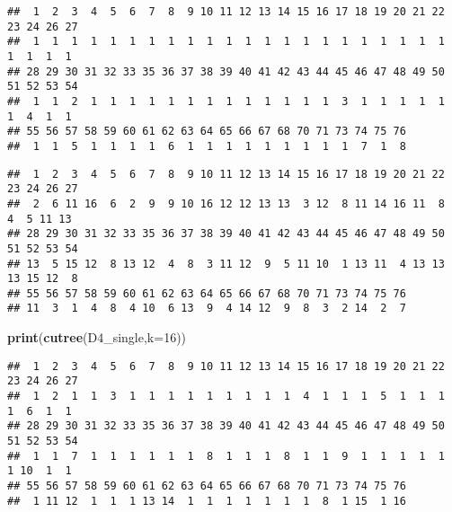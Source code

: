 \documentclass[
]{article}
\newenvironment{Shaded}{\begin{snugshade}}{\end{snugshade}}
\newcommand{\DataTypeTok}[1]{\textcolor[rgb]{0.13,0.29,0.53}{#1}}
\newcommand{\DecValTok}[1]{\textcolor[rgb]{0.00,0.00,0.81}{#1}}
\newcommand{\KeywordTok}[1]{\textcolor[rgb]{0.13,0.29,0.53}{\textbf{#1}}}
\newcommand{\NormalTok}[1]{#1}
\newcommand{\OperatorTok}[1]{\textcolor[rgb]{0.81,0.36,0.00}{\textbf{#1}}}
\begin{document}
\begin{verbatim}
##  1  2  3  4  5  6  7  8  9 10 11 12 13 14 15 16 17 18 19 20 21 22 23 24 26 27 
##  1  1  1  1  1  1  1  1  1  1  1  1  1  1  1  1  1  1  1  1  1  1  1  1  1  1 
## 28 29 30 31 32 33 35 36 37 38 39 40 41 42 43 44 45 46 47 48 49 50 51 52 53 54 
##  1  1  2  1  1  1  1  1  1  1  1  1  1  1  1  1  3  1  1  1  1  1  1  4  1  1 
## 55 56 57 58 59 60 61 62 63 64 65 66 67 68 70 71 73 74 75 76 
##  1  1  5  1  1  1  1  6  1  1  1  1  1  1  1  1  1  7  1  8
\end{verbatim}

\begin{Shaded}
\end{Shaded}

\begin{verbatim}
##  1  2  3  4  5  6  7  8  9 10 11 12 13 14 15 16 17 18 19 20 21 22 23 24 26 27 
##  2  6 11 16  6  2  9  9 10 16 12 12 13 13  3 12  8 11 14 16 11  8  4  5 11 13 
## 28 29 30 31 32 33 35 36 37 38 39 40 41 42 43 44 45 46 47 48 49 50 51 52 53 54 
## 13  5 15 12  8 13 12  4  8  3 11 12  9  5 11 10  1 13 11  4 13 13 13 15 12  8 
## 55 56 57 58 59 60 61 62 63 64 65 66 67 68 70 71 73 74 75 76 
## 11  3  1  4  8  4 10  6 13  9  4 14 12  9  8  3  2 14  2  7
\end{verbatim}

\begin{Shaded}
\begin{Highlighting}[]
\KeywordTok{print}\NormalTok{(}\KeywordTok{cutree}\NormalTok{(D4_single,}\DataTypeTok{k=}\DecValTok{16}\NormalTok{))}
\end{Highlighting}
\end{Shaded}

\begin{verbatim}
##  1  2  3  4  5  6  7  8  9 10 11 12 13 14 15 16 17 18 19 20 21 22 23 24 26 27 
##  1  2  1  1  3  1  1  1  1  1  1  1  1  1  4  1  1  1  5  1  1  1  1  6  1  1 
## 28 29 30 31 32 33 35 36 37 38 39 40 41 42 43 44 45 46 47 48 49 50 51 52 53 54 
##  1  1  7  1  1  1  1  1  1  8  1  1  1  8  1  1  9  1  1  1  1  1  1 10  1  1 
## 55 56 57 58 59 60 61 62 63 64 65 66 67 68 70 71 73 74 75 76 
##  1 11 12  1  1  1 13 14  1  1  1  1  1  1  1  8  1 15  1 16
\end{verbatim}
\end{document}
